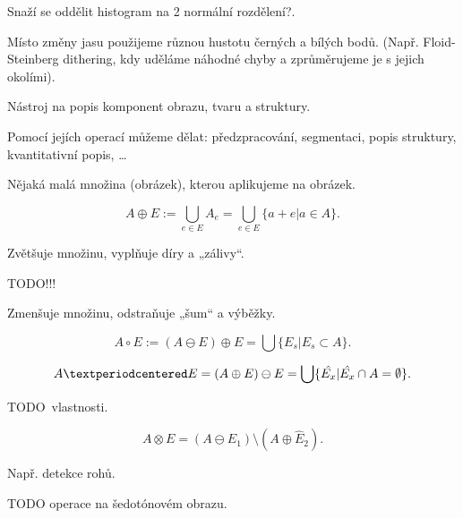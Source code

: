 \documentclass[12pt]{article}					%
\begin{document}
\begin{definice}
	Snaží se oddělit histogram na 2 normální rozdělení?.
\end{definice}

\begin{definice}[Dithering]
	Místo změny jasu použijeme různou hustotu černých a bílých bodů. (Např. Floid-Steinberg dithering, kdy uděláme náhodné chyby a zprůměrujeme je s jejich okolími).
\end{definice}


\begin{definice}
	Nástroj na popis komponent obrazu, tvaru a struktury.

	Pomocí jejích operací můžeme dělat: předzpracování, segmentaci, popis struktury, kvantitativní popis, …
\end{definice}

\begin{definice}
	Nějaká malá množina (obrázek), kterou aplikujeme na obrázek.
\end{definice}

\begin{definice}
	$$ A \oplus E := \bigcup_{e \in E} A_e = \bigcup_{e \in E} \{a + e | a \in A\}. $$

	Zvětšuje množinu, vyplňuje díry a „zálivy“.
\end{definice}

\begin{definice}[Eroze]
	TODO!!!

	Zmenšuje množinu, odstraňuje „šum“ a výběžky.
\end{definice}

\begin{definice}[Otevření]
	$$ A \circ E := (A \ominus E) \oplus E = \bigcup \{E_s| E_s \subset A\}. $$
\end{definice}

\begin{definice}[Uzavření]
	$$ A · E = (A \oplus E) \ominus E = \bigcup\{\hat{E_x} | \hat{E_x} \cap A = \O\}. $$
\end{definice}

TODO vlastnosti.

\begin{definice}
	$$ A \otimes E = (A \ominus E_1) \setminus (A \oplus \hat{E}_2). $$

	Např. detekce rohů.
\end{definice}

TODO operace na šedotónovém obrazu.
\end{document}
